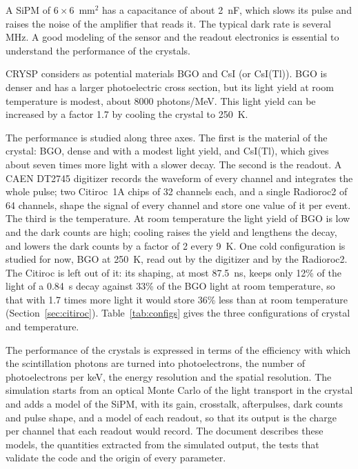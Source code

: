 \documentclass[11pt]{article}
\newcommand{\us}{\textmu s\xspace}
\newcommand{\csitl}{CsI(Tl)\xspace}
\begin{document}
A SiPM of $6 \times 6$~mm$^2$ has a
capacitance of about 2~nF, which slows its pulse and raises the noise of the
amplifier that reads it. The typical dark rate is several MHz. A good modeling of the sensor 
and the readout electronics is essential to understand the performance of the crystals. 

CRYSP considers as potential materials BGO and CsI (or CsI(Tl)). BGO is denser and has a larger photoelectric cross section, but its light yield at room temperature is modest, about 8000 photons/MeV. This light yield can be increased by a factor 1.7 by cooling the crystal to 250~K.

The performance is studied along three axes. The first is the material of
the crystal: BGO, dense and with a modest light yield, and \csitl, which
gives about seven times more light with a slower decay. The second is the
readout. A CAEN DT2745 digitizer records the waveform of every channel and
integrates the whole pulse; two Citiroc~1A chips of 32 channels each, and a
single Radioroc2 of 64 channels, shape the signal of every channel and store
one value of it per event. The third is the temperature. At room
temperature the light yield of BGO is low and the dark counts are high;
cooling raises the yield and lengthens the decay, and lowers the dark counts
by a factor of 2 every 9~K. One cold configuration is studied for now, BGO at
250~K, read out by the digitizer and by the Radioroc2. The Citiroc is left
out of it: its shaping, at most 87.5~ns, keeps only 12\% of the light of a
0.84~\us decay against 33\% of the BGO light at room temperature, so that
with 1.7 times more light it would store 36\% less
than at room temperature (Section~\ref{sec:citiroc}). Table~\ref{tab:configs} gives the
three configurations of crystal and temperature.

The performance of the crystals is expressed in terms of the
efficiency with which the scintillation photons are turned into
photoelectrons, the number of photoelectrons per keV, the energy resolution
and the spatial resolution. The simulation starts from an optical Monte
Carlo of the light transport in the crystal and adds a model of the SiPM,
with its gain, crosstalk, afterpulses, dark counts and pulse shape, and a
model of each readout, so that its output is the charge per channel that
each readout would record. The document describes these models, the
quantities extracted from the simulated output, the tests that validate the
code and the origin of every parameter.
\end{document}
